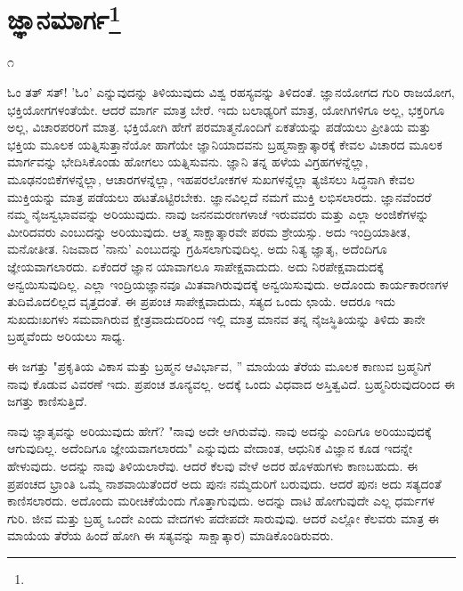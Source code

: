 
\chapter[ಜ್ಞಾನಮಾರ್ಗ]{ಜ್ಞಾನಮಾರ್ಗ\protect\footnote{}}

\begin{center}
೧
\end{center}

ಓಂ ತತ್ ಸತ್! 'ಓಂ' ಎನ್ನುವುದನ್ನು ತಿಳಿಯುವುದು ವಿಶ್ವ ರಹಸ್ಯವನ್ನು ತಿಳಿದಂತೆ. ಜ್ಞಾನಯೋಗದ ಗುರಿ ರಾಜಯೋಗ, ಭಕ್ತಿಯೋಗಗಳಂತೆಯೇ. ಆದರೆ ಮಾರ್ಗ ಮಾತ್ರ ಬೇರೆ. ಇದು ಬಲಾಢ್ಯರಿಗೆ ಮಾತ್ರ, ಯೋಗಿಗಳಿಗೂ ಅಲ್ಲ, ಭಕ್ತರಿಗೂ ಅಲ್ಲ, ವಿಚಾರಪರರಿಗೆ ಮಾತ್ರ. ಭಕ್ತಿಯೋಗಿ ಹೇಗೆ ಪರಮಾತ್ಮನೊಂದಿಗೆ ಏಕತೆಯನ್ನು ಪಡೆಯಲು ಪ್ರೀತಿಯ ಮತ್ತು ಭಕ್ತಿಯ ಮೂಲಕ ಯತ್ನಿಸುತ್ತಾನೆಯೋ ಹಾಗೆಯೇ ಜ್ಞಾನಿಯಾದವನು ಬ್ರಹ್ಮಸಾಕ್ಷಾತ್ಕಾರಕ್ಕೆ ಕೇವಲ ವಿಚಾರದ ಮೂಲಕ ಮಾರ್ಗವನ್ನು ಭೇದಿಸಿಕೊಂಡು ಹೋಗಲು ಯತ್ನಿಸುವನು. ಜ್ಞಾನಿ ತನ್ನ ಹಳೆಯ ವಿಗ್ರಹಗಳನ್ನೆಲ್ಲಾ, ಮೂಢನಂಬಿಕೆಗಳನ್ನೆಲ್ಲಾ, ಆಚಾರಗಳನ್ನೆಲ್ಲಾ, ಇಹಪರಲೋಕಗಳ ಸುಖಗಳನ್ನೆಲ್ಲಾ ತ್ಯಜಿಸಲು ಸಿದ್ಧನಾಗಿ ಕೇವಲ ಮುಕ್ತಿಯನ್ನು ಮಾತ್ರ ಪಡೆಯಲು ಹಟತೊಟ್ಟಿರಬೇಕು. ಜ್ಞಾನವಿಲ್ಲದೆ ನಮಗೆ ಮುಕ್ತಿ ಲಭಿಸಲಾರದು. ಜ್ಞಾನವೆಂದರೆ ನಮ್ಮ ನೈಜಸ್ವಭಾವವನ್ನು ಅರಿಯುವುದು. ನಾವು ಜನನಮರಣಗಳಾಚೆ ಇರುವವರು ಮತ್ತು ಎಲ್ಲಾ ಅಂಜಿಕೆಗಳನ್ನು ಮೀರಿದವರು ಎಂಬುದನ್ನು ಅರಿಯುವುದು. ಆತ್ಮ ಸಾಕ್ಷಾತ್ಕಾರವೇ ಪರಮ ಶ್ರೇಯಸ್ಸು. ಅದು ಇಂದ್ರಿಯಾತೀತ, ಮನೋತೀತ. ನಿಜವಾದ 'ನಾನು' ಎಂಬುದನ್ನು ಗ್ರಹಿಸಲಾಗುವುದಿಲ್ಲ. ಅದು ನಿತ್ಯ ಜ್ಞಾತೃ, ಅದೆಂದಿಗೂ ಜ್ಞೇಯವಾಗಲಾರದು. ಏಕೆಂದರೆ ಜ್ಞಾನ ಯಾವಾಗಲೂ ಸಾಪೇಕ್ಷವಾದುದು. ಅದು ನಿರಪೇಕ್ಷವಾದುದಕ್ಕೆ ಅನ್ವಯಿಸುವುದಿಲ್ಲ. ಎಲ್ಲಾ ಇಂದ್ರಿಯಜ್ಞಾನವೂ ಮಿತವಾಗಿರುವುದಕ್ಕೆ ಅನ್ವಯಿಸುವುದು. ಅದೊಂದು ಕಾರ್ಯಕಾರಣಗಳ ತುದಿಮೊದಲಿಲ್ಲದ ವೃತ್ತದಂತೆ. ಈ ಪ್ರಪಂಚ ಸಾಪೇಕ್ಷವಾದುದು, ಸತ್ಯದ ಒಂದು ಛಾಯೆ. ಆದರೂ ಇದು ಸುಖದುಃಖಗಳು ಸಮವಾಗಿರುವ ಕ್ಷೇತ್ರವಾದುದರಿಂದ ಇಲ್ಲಿ ಮಾತ್ರ ಮಾನವ ತನ್ನ ನೈಜಸ್ಥಿತಿಯನ್ನು ತಿಳಿದು ತಾನೇ ಬ್ರಹ್ಮವೆಂದು ಅರಿಯಲು ಸಾಧ್ಯ.

ಈ ಜಗತ್ತು "ಪ್ರಕೃತಿಯ ವಿಕಾಸ ಮತ್ತು ಬ್ರಹ್ಮನ ಆವಿರ್ಭಾವ, '' ಮಾಯೆಯ ತೆರೆಯ ಮೂಲಕ ಕಾಣುವ ಬ್ರಹ್ಮನಿಗೆ ನಾವು ಕೊಡುವ ವಿವರಣೆ ಇದು. ಪ್ರಪಂಚ ಶೂನ್ಯವಲ್ಲ. ಅದಕ್ಕೆ ಒಂದು ವಿಧವಾದ ಅಸ್ತಿತ್ವವಿದೆ. ಬ್ರಹ್ಮನಿರುವುದರಿಂದ ಈ ಜಗತ್ತು ಕಾಣಿಸುತ್ತಿದೆ.

ನಾವು ಜ್ಞಾತೃವನ್ನು ಅರಿಯುವುದು ಹೇಗೆ? "ನಾವು ಅದೇ ಆಗಿರುವೆವು. ನಾವು ಅದನ್ನು ಎಂದಿಗೂ ಅರಿಯುವುದಕ್ಕೆ ಆಗುವುದಿಲ್ಲ. ಅದೆಂದಿಗೂ ಜ್ಞೇಯವಾಗಲಾರದು" ಎನ್ನುವುದು ವೇದಾಂತ, ಆಧುನಿಕ ವಿಜ್ಞಾನ ಕೂಡ ಇದನ್ನೇ ಹೇಳುವುದು. ಅದನ್ನು ನಾವು ತಿಳಿಯಲಾರೆವು. ಆದರೆ ಕೆಲವು ವೇಳೆ ಅದರ ಹೊಳಹುಗಳು ಕಾಣಬಹುದು. ಈ ಪ್ರಪಂಚದ ಭ್ರಾಂತಿ ಒಮ್ಮೆ ನಾಶವಾಯಿತೆಂದರೆ ಅದು ಪುನಃ ನಮ್ಮೆದುರಿಗೆ ಬರುವುದು. ಆದರೆ ಪುನಃ ಅದು ಸತ್ಯದಂತೆ ಕಾಣಿಸಲಾರದು. ಅದೊಂದು ಮರೀಚಿಕೆಯೆಂದು ಗೊತ್ತಾಗುವುದು. ಅದನ್ನು ದಾಟಿ ಹೋಗುವುದೇ ಎಲ್ಲ ಧರ್ಮಗಳ ಗುರಿ. ಜೀವ ಮತ್ತು ಬ್ರಹ್ಮ ಒಂದೇ ಎಂದು ವೇದಗಳು ಪದೇಪದೇ ಸಾರುವುವು. ಆದರೆ ಎಲ್ಲೋ ಕೆಲವರು ಮಾತ್ರ ಈ ಮಾಯೆಯ ತೆರೆಯ ಹಿಂದೆ ಹೋಗಿ ಈ ಸತ್ಯವನ್ನು ಸಾಕ್ಷಾತ್ಕಾರ) ಮಾಡಿಕೊಂಡಿರುವರು.

